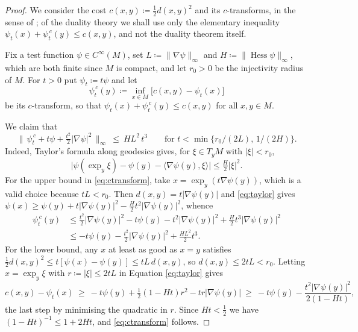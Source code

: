 \documentclass[11pt,reqno]{amsart}
\theoremstyle{plain}
\theoremstyle{definition}
\DeclareMathOperator{\Hess}{Hess}
\begin{document}
\begin{proof}
    We consider the cost \( c(x,y)\coloneqq\tfrac12d(x,y)^2 \) and its \( c \)-transforms, in the sense of \cite[Chapter~5]{villani_optimal_2009}; of the duality theory we shall use only the elementary inequality \( \psi_t(x)+\psi_t^{\,c}(y)\le c(x,y) \), and not the duality theorem itself.

    Fix a test function \( \psi\in C^\infty(M) \), set \( L\coloneqq\lVert\nabla\psi\rVert_\infty \) and \( H\coloneqq\lVert\Hess\psi\rVert_\infty \), which are both finite since \( M \) is compact, and let \( r_0>0 \) be the injectivity radius of \( M \).
    For \( t>0 \) put \( \psi_t\coloneqq t\psi \) and let
    \[
        \psi_t^{\,c}(y)\coloneqq\inf_{x\in M}\big[c(x,y)-\psi_t(x)\big]
    \]
    be its \( c \)-transform, so that \( \psi_t(x)+\psi_t^{\,c}(y)\le c(x,y) \) for all \( x,y\in M \).

    We claim that
    \begin{equation}\label{eq:ctransform}
        \Big\lVert\,\psi_t^{\,c}+t\psi+\tfrac{t^2}{2}\lvert\nabla\psi\rvert^2\,\Big\rVert_\infty
        \ \le\ HL^2\,t^3
        \qquad\text{for }t<\min\{r_0/(2L),\,1/(2H)\} .
    \end{equation}
    Indeed, Taylor's formula along geodesics gives, for \( \xi\in T_yM \) with \( \lvert\xi\rvert<r_0 \),
    \begin{equation}\label{eq:taylor}
        \big\lvert\psi(\exp_y\xi)-\psi(y)-\langle\nabla\psi(y),\xi\rangle\big\rvert\le\tfrac{H}{2}\lvert\xi\rvert^2 .
    \end{equation}
    For the upper bound in \eqref{eq:ctransform}, take \( x=\exp_y\left(t\nabla\psi(y)\right) \), which is a valid choice because \( tL<r_0 \).
    Then \( d(x,y)=t\lvert\nabla\psi(y)\rvert \) and \eqref{eq:taylor} gives \( \psi(x)\ge\psi(y)+t\lvert\nabla\psi(y)\rvert^2-\tfrac{H}{2}t^2\lvert\nabla\psi(y)\rvert^2 \), whence
    \begin{align*}
        \psi_t^{\,c}(y)
        &\le\tfrac{t^2}{2}\lvert\nabla\psi(y)\rvert^2-t\psi(y)-t^2\lvert\nabla\psi(y)\rvert^2+\tfrac{H}{2}t^3\lvert\nabla\psi(y)\rvert^2\\
        &\le-t\psi(y)-\tfrac{t^2}{2}\lvert\nabla\psi(y)\rvert^2+\tfrac{HL^2}{2}t^3 .
    \end{align*}
    For the lower bound, any \( x \) at least as good as \( x=y \) satisfies \( \tfrac12d(x,y)^2\le t[\psi(x)-\psi(y)]\le tL\,d(x,y) \), so \( d(x,y)\le2tL<r_0 \).
    Letting \( x=\exp_y\xi \) with \( r\coloneqq\lvert\xi\rvert\le2tL \) in Equation \eqref{eq:taylor} gives
    \[
        c(x,y)-\psi_t(x)\ \ge\ -t\psi(y)+\tfrac12(1-Ht)r^2-tr\lvert\nabla\psi(y)\rvert
        \ \ge\ -t\psi(y)-\frac{t^2\lvert\nabla\psi(y)\rvert^2}{2(1-Ht)} ,
    \]
    the last step by minimising the quadratic in \( r \).
    Since \( Ht<\tfrac12 \) we have \( (1-Ht)^{-1}\le1+2Ht \), and \eqref{eq:ctransform} follows.


\end{proof}
\end{document}
